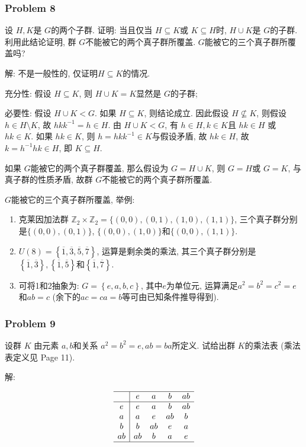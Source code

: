 \documentclass[a4paper,12pt]{ctexart}
\newcommand{\Z}{\mathbb{Z}}
\begin{document}
\subsubsection*{Problem 8}
  设 $ H,K $是 $ G $的两个子群. 证明: 当且仅当 $ H\subseteq K $或 $ K\subseteq H $时, $ H\cup K $是 $ G $的子群. 
  利用此结论证明, 群 $ G $不能被它的两个真子群所覆盖. $ G $能被它的三个真子群所覆盖吗?

  解: 不是一般性的, 仅证明$H\subseteq K$的情况.
  
  充分性: 假设 $ H\subseteq K $, 则 $ H\cup K=K $显然是 $ G $的子群;

  必要性: 假设 $ H\cup K<G $. 如果 $ H\subseteq K $, 则结论成立. 
  因此假设 $ H\nsubseteq K $, 则假设 $ h\in H\setminus K $, 故 $ hkk^{-1}=h\in H $.
  由 $ H\cup K<G $, 有 $ h\in H,k\in K $且 $ hk\in H $ 或 $ hk\in K $. 如果 $ hk\in K $, 则 $ h=hkk^{-1}\in K $与假设矛盾, 故 $ hk\in H $, 故 $ k=h^{-1}hk\in H $, 
  即 $ K\subseteq H $.

  如果 $ G $能被它的两个真子群覆盖, 那么假设为 $ G=H\cup K $, 则 $ G=H $或 $ G=K $, 与真子群的性质矛盾, 故群 $ G $不能被它的两个真子群所覆盖.

  $ G $能被它的三个真子群所覆盖, 举例: 
  \begin{enumerate}
    \item 克莱因加法群 $ \Z_2\times\Z_2=\{(0,0),(0,1),(1,0),(1,1)\} $, 三个真子群分别是$\{(0,0),(0,1)\}$, $\{(0,0),(1,0)\}$和$\{(0,0),(1,1)\}$.
    \item $U(8)=\left\{ \overline{1},\overline{3},\overline{5},\overline{7} \right\}$, 运算是剩余类的乘法, 其三个真子群分别是$\left\{ \overline{1},\overline{3} \right\},\left\{ \overline{1},\overline{5} \right\}$和$\left\{ \overline{1},\overline{7} \right\}$.
    \item 可将1和2抽象为: $G=\left\{ e,a,b,c \right\}$, 其中$e$为单位元, 运算满足$a^2=b^2=c^2=e$和$ab=c$ (余下的$ac=ca=b$等可由已知条件推导得到).
  \end{enumerate}

\subsubsection*{Problem 9}
  设群 $ K $ 由元素 $ a,b $和关系 $ a^2=b^2=e,ab=ba $所定义. 试给出群 $ K $的乘法表 (乘法表定义见 Page 11).

  解:

  \[\begin{array}{c|cccc}
    \hline 
       & e  & a  & b  & ab \\
    \hline    
    e  & e  & a  & b  & ab \\
    a  & a  & e  & ab & b  \\
    b  & b  & ab & e  & a  \\
    ab & ab & b  & a  & e  \\
    \hline
    \end{array}\]
\end{document}
